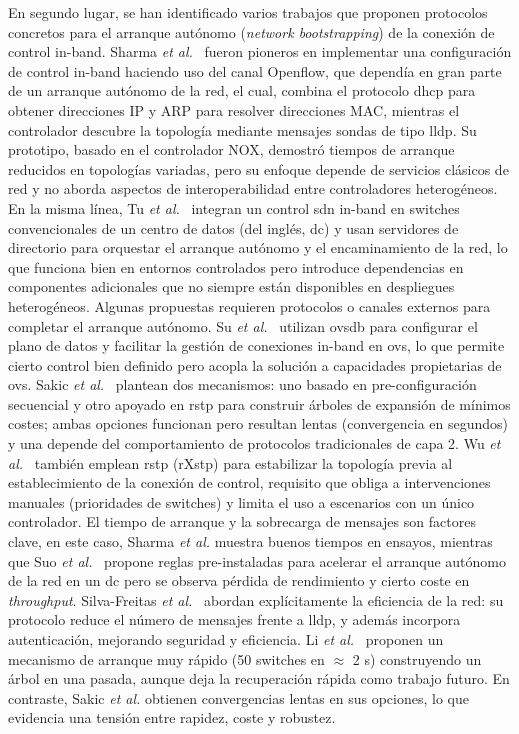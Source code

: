 En segundo lugar, se han identificado varios trabajos que proponen protocolos concretos para el arranque autónomo (\textit{network bootstrapping}) de la conexión de control in-band. Sharma \textit{et al.}~\cite{Sharma13} fueron pioneros en implementar una configuración de control in-band haciendo uso del canal Openflow, que dependía en gran parte de un arranque autónomo de la red, el cual, combina el protocolo \gls{dhcp} para obtener direcciones IP y ARP para resolver direcciones MAC, mientras el controlador descubre la topología mediante mensajes sondas de tipo \gls{lldp}. Su prototipo, basado en el controlador NOX, demostró tiempos de arranque reducidos en topologías variadas, pero su enfoque depende de servicios clásicos de red y no aborda aspectos de interoperabilidad entre controladores heterogéneos. En la misma línea, Tu \textit{et al.}~\cite{Tu14} integran un control \gls{sdn} in-band en switches convencionales de un centro de datos (del inglés, \gls{dc}) y usan servidores de directorio para orquestar el arranque autónomo y el encaminamiento de la red, lo que funciona bien en entornos controlados pero introduce dependencias en componentes adicionales que no siempre están disponibles en despliegues heterogéneos. Algunas propuestas requieren protocolos o canales externos para completar el arranque autónomo. Su \textit{et al.}~\cite{Su17} utilizan \gls{ovsdb} para configurar el plano de datos y facilitar la gestión de conexiones in-band en \gls{ovs}, lo que permite cierto control bien definido pero acopla la solución a capacidades propietarias de \gls{ovs}. Sakic \textit{et al.}~\cite{Sakic20} plantean dos mecanismos: uno basado en pre-configuración secuencial y otro apoyado en \gls{rstp} para construir árboles de expansión de mínimos costes; ambas opciones funcionan pero resultan lentas (convergencia en segundos) y una depende del comportamiento de protocolos tradicionales de capa 2. Wu \textit{et al.}~\cite{Wu21} también emplean \gls{rstp} (rXstp) para estabilizar la topología previa al establecimiento de la conexión de control, requisito que obliga a intervenciones manuales (prioridades de switches) y limita el uso a escenarios con un único controlador. El tiempo de arranque y la sobrecarga de mensajes son factores clave, en este caso, Sharma \textit{et al.} muestra buenos tiempos en ensayos, mientras que Suo \textit{et al.}~\cite{Suo16} propone reglas pre-instaladas para acelerar el arranque autónomo de la red en un \gls{dc} pero se observa pérdida de rendimiento y cierto coste en \textit{throughput}. Silva-Freitas \textit{et al.}~\cite{Silva-Freitas20} abordan explícitamente la eficiencia de la red: su protocolo reduce el número de mensajes frente a \gls{lldp}, y además incorpora autenticación, mejorando seguridad y eficiencia. Li \textit{et al.}~\cite{Li21} proponen un mecanismo de arranque muy rápido (50 switches en $\approx$ 2 s) construyendo un árbol en una pasada, aunque deja la recuperación rápida como trabajo futuro. En contraste, Sakic \textit{et al.} obtienen convergencias lentas en sus opciones, lo que evidencia una tensión entre rapidez, coste y robustez.\\
